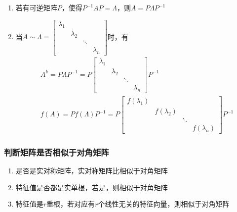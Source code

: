 \documentclass[./linear_algebra.tex]{subfiles}
\begin{document}
    \begin{enumerate}
        \item 若有可逆矩阵$P$，使得$P^{-1}AP = \Lambda$，则$A = P\Lambda P^{-1}$
        \item 当$A\sim \Lambda = \begin{bmatrix}
                                     \lambda_1 &&& \\
                                     & \lambda_2 &&\\
                                     &&\ddots & \\
                                     &&&\lambda_n
        \end{bmatrix}$时，有\begin{align*}
                               & A^k = P\Lambda P^{-1} = P\begin{bmatrix}
                                                              \lambda_1 &&& \\
                                                              & \lambda_2 &&\\
                                                              &&\ddots & \\
                                                              &&&\lambda_n
                               \end{bmatrix}P^{-1} \\
                               & f(A) = Pf(\Lambda)P^{-1} = P\begin{bmatrix}
                                                                 f(\lambda_1) &&& \\
                                                                 & f(\lambda_2) &&\\
                                                                 &&\ddots & \\
                                                                 &&&f(\lambda_n)
                               \end{bmatrix}P^{-1}
        \end{align*}
    \end{enumerate}

    \subsubsection{判断矩阵是否相似于对角矩阵}

    \begin{enumerate}
        \item 是否是实对称矩阵，实对称矩阵比相似于对角矩阵
        \item 特征值是否都是实单根，若是，则相似于对角矩阵
        \item 特征值是$r$重根，若对应有$r$个线性无关的特征向量，则相似于对角矩阵
    \end{enumerate}
\end{document}

